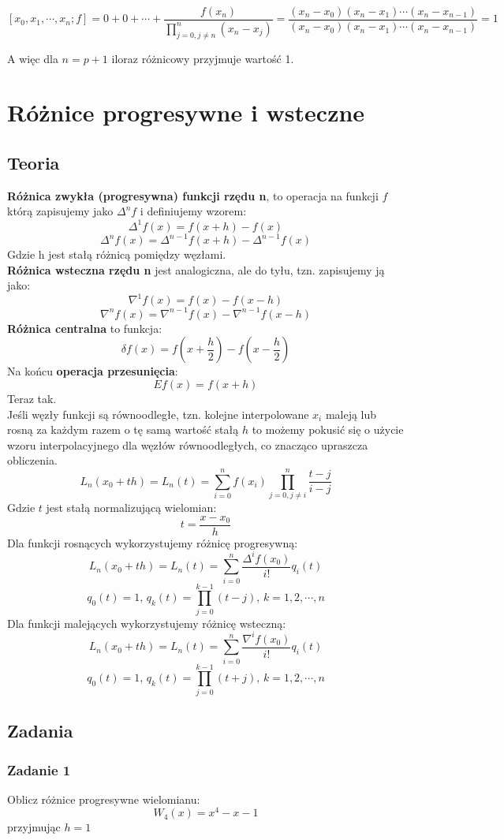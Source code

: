 \documentclass[a4paper]{article}
\begin{document}
$$[x_0,x_1,\cdots,x_n;f] = 0 + 0 + \cdots + \frac{f(x_n)}{\prod_{j=0, j\neq n}^n(x_n - x_j)} = \frac{(x_n-x_0)(x_n-x_1)\cdots(x_n-x_{n-1})}{(x_n-x_0)(x_n-x_1)\cdots(x_n-x_{n-1})} = 1$$

A więc dla $n = p+1$ iloraz różnicowy przyjmuje wartość 1.

\section{Różnice progresywne i wsteczne}
\subsection{Teoria}
\textbf{Różnica zwykła (progresywna) funkcji rzędu n}, to operacja na funkcji $f$ którą zapisujemy jako $\Delta^n f$ i definiujemy wzorem:
$$\Delta^1 f(x) = f(x+h) - f(x)$$
$$\Delta^n f(x) = \Delta^{n-1}f(x+h) - \Delta^{n-1}f(x)$$
Gdzie h jest stałą różnicą pomiędzy węzłami.\\
\textbf{Różnica wsteczna rzędu n} jest analogiczna, ale do tyłu, tzn. zapisujemy ją jako:
$$\nabla^1 f(x) = f(x) - f(x-h)$$
$$\nabla^n f(x) = \nabla^{n-1}f(x) - \nabla^{n-1}f(x-h)$$
\textbf{Różnica centralna} to funkcja:
$$\delta f(x) = f(x+\frac{h}{2}) - f(x-\frac{h}{2})$$
Na końcu \textbf{operacja przesunięcia}:
$$Ef(x) = f(x+h)$$
Teraz tak.\\
Jeśli węzły funkcji są równoodległe, tzn. kolejne interpolowane $x_i$ maleją lub rosną za każdym razem o tę samą wartość stałą $h$ to możemy pokusić się o użycie wzoru interpolacyjnego dla węzłów równoodległych, co znacząco upraszcza obliczenia.\\
$$L_n(x_0+th) = L_n(t) = \sum_{i=0}^n f(x_i) \prod_{j=0, j\neq i}^n\frac{t-j}{i-j}$$
Gdzie $t$ jest stałą normalizującą wielomian:
$$t = \frac{x-x_0}{h}$$
Dla funkcji rosnących wykorzystujemy różnicę progresywną:
$$L_n(x_0+th) = L_n(t) = \sum_{i=0}^n\frac{\Delta^if(x_0)}{i!}q_i(t)$$
$$q_0(t) = 1\text{,\ \ }q_k(t)=\prod_{j=0}^{k-1}(t-j)\text{,\ \ }k=1,2,\cdots,n$$
Dla funkcji malejących wykorzystujemy różnicę wsteczną:
$$L_n(x_0+th) = L_n(t) = \sum_{i=0}^n\frac{\nabla^if(x_0)}{i!}q_i(t)$$
$$q_0(t)=1 \text{,\ \ }q_k(t) = \prod_{j=0}^{k-1}(t+j)\text{,\ \ }k=1,2,\cdots,n$$

\subsection{Zadania}
\subsubsection*{Zadanie 1}
Oblicz różnice progresywne wielomianu:
$$W_4(x)=x^4-x-1$$
przyjmując $h=1$
\end{document}
